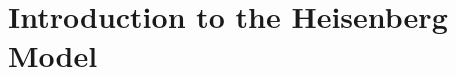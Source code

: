 \documentclass[../main.tex]{subfiles}
\begin{document}
\chapter{Introduction to the Heisenberg Model}






\end{document}
